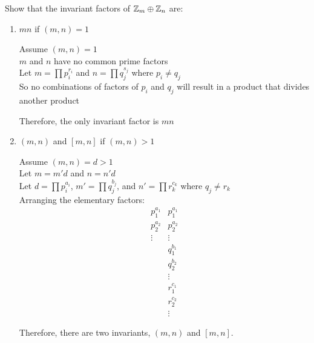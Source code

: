 \documentclass[letterpaper,12pt,fleqn]{article}
\begin{document}
Show that the invariant factors of $\mathbb{Z}_m\oplus\mathbb{Z}_n$ are:
\begin{enumerate}[label={\alph*)}]
\item $mn$ if $(m,n)=1$

  Assume $(m,n)=1$ \\
  $m$ and $n$ have no common prime factors \\
  Let $m=\prod{p_i^{r_i}}$ and $n=\prod{q_j^{s_j}}$ where $p_i\ne q_j$ \\
  So no combinations of factors of $p_i$ and $q_j$ will result in a product
  that divides another product

  Therefore, the only invariant factor is $mn$
  
\item $(m,n)$ and $[m,n]$ if $(m,n)>1$

  Assume $(m,n)=d>1$ \\
  Let $m=m'd$ and $n=n'd$ \\
  Let $d=\prod{p_i^{a_i}}$, $m'=\prod{q_j^{b_j}}$, and $n'=\prod{r_k^{c_k}}$
  where $q_j\ne r_k$ \\
  Arranging the elementary factors:
  \[\begin{array}{cc}
  p_1^{a_1} & p_1^{a_1} \\
  p_2^{a_2} & p_2^{a_2} \\
  \vdots & \vdots \\
  & q_1^{b_1} \\
  & q_2^{b_2} \\
  & \vdots \\
  & r_1^{c_1} \\
  & r_2^{c_2} \\
  & \vdots
  \end{array}\]

  Therefore, there are two invariants, $(m,n)$ and $[m,n]$.
\end{enumerate}
\end{document}
